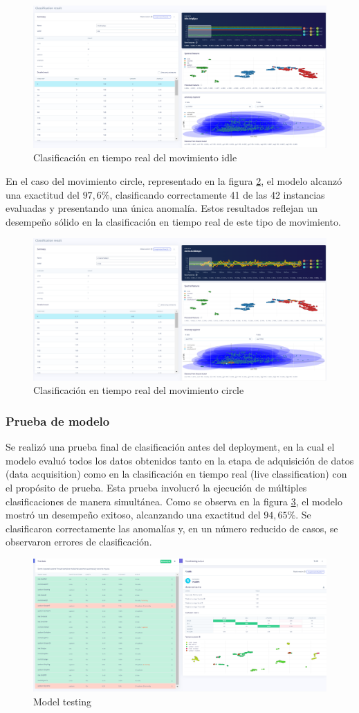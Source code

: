 \documentclass[12pt,a4paper]{article}
\begin{document}
\begin{figure}[H]
    \centering
    \includegraphics[width=0.6\linewidth]{Imagenes/live_idle.png}
    \caption{Clasificación en tiempo real del movimiento idle}
    \label{fig:15}
\end{figure}

En el caso del movimiento circle, representado en la figura \ref{fig:16}, el modelo alcanzó una exactitud del $97,6\%$, clasificando correctamente 41 de las 42 instancias evaluadas y presentando una única anomalía. Estos resultados reflejan un desempeño sólido en la clasificación en tiempo real de este tipo de movimiento.

\begin{figure}[H]
    \centering
    \includegraphics[width=0.6\linewidth]{Imagenes/live_circle.png}
    \caption{Clasificación en tiempo real del movimiento circle}
    \label{fig:16}
\end{figure}

\subsubsection{Prueba de modelo}
Se realizó una prueba final de clasificación antes del deployment, en la cual el modelo evaluó todos los datos obtenidos tanto en la etapa de adquisición de datos (data acquisition) como en la clasificación en tiempo real (live classification) con el propósito de prueba. Esta prueba involucró la ejecución de múltiples clasificaciones de manera simultánea. Como se observa en la figura \ref{fig:17}, el modelo mostró un desempeño exitoso, alcanzando una exactitud del $94,65\%$. Se clasificaron correctamente las anomalías y, en un número reducido de casos, se observaron errores de clasificación.
\begin{figure}[H]
    \centering
    \includegraphics[width=0.8\linewidth]{Imagenes/model_testing.png}
    \caption{Model testing}
    \label{fig:17}
\end{figure}
\end{document}
